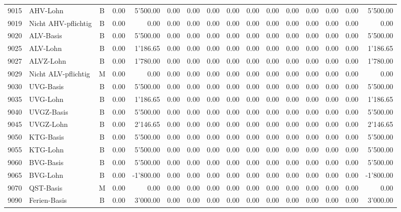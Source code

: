 \documentclass[8pt,a4paper]{extarticle}
\begin{document}
\begin{longtable}{@{\extracolsep{\fill}} l l c r r r r r r r r r r r r r}
9015&AHV-Lohn&B&0.00&5'500.00&0.00&0.00&0.00&0.00&0.00&0.00&0.00&0.00&0.00&0.00&5'500.00\\
9019&Nicht AHV-pflichtig&B&0.00&0.00&0.00&0.00&0.00&0.00&0.00&0.00&0.00&0.00&0.00&0.00&0.00\\
9020&ALV-Basis&B&0.00&5'500.00&0.00&0.00&0.00&0.00&0.00&0.00&0.00&0.00&0.00&0.00&5'500.00\\
9025&ALV-Lohn&B&0.00&1'186.65&0.00&0.00&0.00&0.00&0.00&0.00&0.00&0.00&0.00&0.00&1'186.65\\
9027&ALVZ-Lohn&B&0.00&1'780.00&0.00&0.00&0.00&0.00&0.00&0.00&0.00&0.00&0.00&0.00&1'780.00\\
9029&Nicht ALV-pflichtig&M&0.00&0.00&0.00&0.00&0.00&0.00&0.00&0.00&0.00&0.00&0.00&0.00&0.00\\
9030&UVG-Basis&B&0.00&5'500.00&0.00&0.00&0.00&0.00&0.00&0.00&0.00&0.00&0.00&0.00&5'500.00\\
9035&UVG-Lohn&B&0.00&1'186.65&0.00&0.00&0.00&0.00&0.00&0.00&0.00&0.00&0.00&0.00&1'186.65\\
9040&UVGZ-Basis&B&0.00&5'500.00&0.00&0.00&0.00&0.00&0.00&0.00&0.00&0.00&0.00&0.00&5'500.00\\
9045&UVGZ-Lohn&B&0.00&2'146.65&0.00&0.00&0.00&0.00&0.00&0.00&0.00&0.00&0.00&0.00&2'146.65\\
9050&KTG-Basis&B&0.00&5'500.00&0.00&0.00&0.00&0.00&0.00&0.00&0.00&0.00&0.00&0.00&5'500.00\\
9055&KTG-Lohn&B&0.00&5'500.00&0.00&0.00&0.00&0.00&0.00&0.00&0.00&0.00&0.00&0.00&5'500.00\\
9060&BVG-Basis&B&0.00&5'500.00&0.00&0.00&0.00&0.00&0.00&0.00&0.00&0.00&0.00&0.00&5'500.00\\
9065&BVG-Lohn&B&0.00&-1'800.00&0.00&0.00&0.00&0.00&0.00&0.00&0.00&0.00&0.00&0.00&-1'800.00\\
9070&QST-Basis&M&0.00&0.00&0.00&0.00&0.00&0.00&0.00&0.00&0.00&0.00&0.00&0.00&0.00\\
9090&Ferien-Basis&B&0.00&3'000.00&0.00&0.00&0.00&0.00&0.00&0.00&0.00&0.00&0.00&0.00&3'000.00\\

\end{longtable}
\pagebreak
\end{document}
